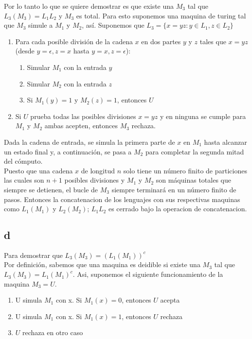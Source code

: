 Por lo tanto lo que se quiere demostrar es que existe una $M_3$ tal que $L_3(M_3) = L_1 L_2$ y $M_3$ es total. Para esto suponemos una maquina de turing tal que $M_3$ simule a $M_1$ y $M_2$, así. Suponemos que $L_3= \{x=yz: y \in L_1 , z \in L_2 \}$

\begin{enumerate}
\item Para cada posible división de la cadena $x$ en dos partes $y$ y $z$ tales que $x = yz$ (desde $y = \epsilon, z = x$ hasta $y = x, z = \epsilon$):
\begin{enumerate}
\item Simular $M_1$ con la entrada $y$
\item Simular $M_2$ con la entrada $z$
\item Si $M_1(y) = 1$ y $M_2(z) = 1$, entonces $U$
\end{enumerate}
\item Si $U$ prueba todas las posibles divisiones $x = yz$ y en ninguna se cumple para $M_1$ y $M_2$ ambas acepten, entonces $M_3$ rechaza.
\end{enumerate}

Dada la cadena de entrada, se simula la primera parte de $x$ en $M_1$ hasta alcanzar un estado final y, a continuación, se pasa a $M_2$ para completar la segunda mitad del cómputo.\\

Puesto que una cadena $x$ de longitud $n$ solo tiene un número finito de particiones las cuales son $n+1$ posibles divisiones y $M_1$ y $M_2$ son máquinas totales que siempre se detienen, el bucle de $M_3$ siempre terminará en un número finito de pasos. Entonces la concatenacion de los lenguajes con sus respectivas maquinas como $L_1(M_1)$ y $L_2(M_2)$;  $L_1L_2$ es cerrado bajo la operacion de concatenacion. 

\subsection*{d}

Para demostrar que $L_3(M_3)= (L_1(M_1))^c$\\

Por definición, sabemos que una maquina es deidible si existe una $M_3$ tal que $L_3(M_3) = L_1(M_1)^c$. Asi, suponemos el siguiente funcionamiento de la maquina $M_3 = U$.\\

\begin{enumerate}
    \item U simula $M_1$ con x. Si $M_1(x) = 0$, entonces $U$ acepta
    \item U simula $M_1$ con x. Si $M_1(x) = 1$, entonces $U$ rechaza
    \item $U$ rechaza en otro caso
\end{enumerate}

